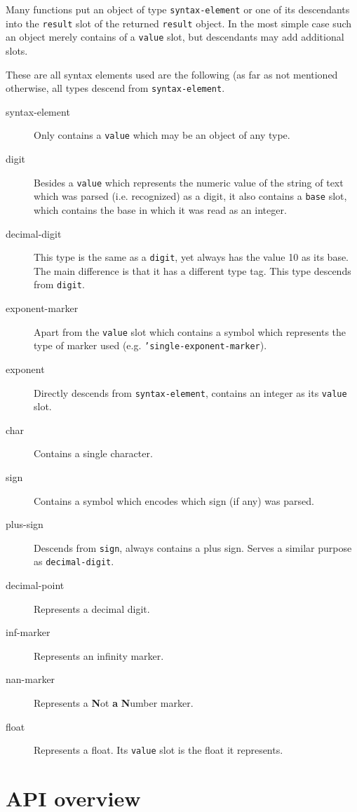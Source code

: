 \documentclass[a4paper,10pt,twoside]{report}
\newcommand{\sym}[1]{\texttt{#1}}
\begin{document}
Many functions put an object of type \sym{syntax-element} or one of
its descendants into the \sym{result} slot of the returned
\sym{result} object.  In the most simple case such an object merely
contains of a \sym{value} slot, but descendants may add additional slots.

These are all syntax elements used are the following (as far as not mentioned
otherwise, all types descend from \sym{syntax-element}.

\begin{description}
\item[syntax-element] Only contains a \sym{value} which may be an object of any
  type. 
\item[digit] Besides a \sym{value} which represents the numeric value of the
  string of text which was parsed (i.e. recognized) as a digit, it also contains
  a \sym{base} slot, which contains the base in which it was read as an integer.
\item[decimal-digit] This type is the same as a \sym{digit}, yet always has the
  value 10 as its base.  The main difference is that it has a different type
  tag.  This type descends from \sym{digit}.
\item[exponent-marker] Apart from the \sym{value} slot which contains a
  symbol which represents the type of marker used
  (e.g. \sym{'single-exponent-marker}).
\item[exponent] Directly descends from \sym{syntax-element}, contains an integer
  as its \sym{value} slot.
\item[char] Contains a single character.
\item[sign] Contains a symbol which encodes which sign (if any) was parsed.
\item[plus-sign] Descends from \sym{sign}, always contains a plus sign.  Serves
  a similar purpose as \sym{decimal-digit}.
\item[decimal-point] Represents a decimal digit.
\item[inf-marker] Represents an infinity marker.
\item[nan-marker] Represents a \textbf{N}ot \textbf{a} \textbf{N}umber marker.
\item[float] Represents a float.  Its \sym{value} slot is the float it
  represents.
\end{description}

\chapter{API overview}
\label{chapter:api-overview}
\end{document}
